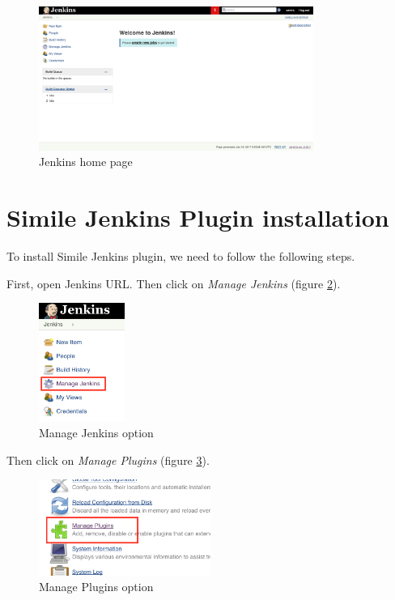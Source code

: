 \begin{figure}[H]
	\centering
    \includegraphics[width=0.8\textwidth]{grafiken/jenkins-04}
    \caption{Jenkins home page}
    \label{fig:jenkins-04}
\end{figure}

\section{Simile Jenkins Plugin installation}
To install Simile Jenkins plugin, we need to follow the following steps.

First, open Jenkins URL. Then click on \textit{Manage Jenkins} (figure \ref{fig:jenkins-plugin-01}).

\begin{figure}[H]
	\centering
    \includegraphics[width=0.25\textwidth]{grafiken/jenkins-plugin-01}
    \caption{Manage Jenkins option}
    \label{fig:jenkins-plugin-01}
\end{figure}

Then click on \textit{Manage Plugins} (figure \ref{fig:jenkins-plugin-02}).

\begin{figure}[H]
	\centering
    \includegraphics[width=0.5\textwidth]{grafiken/jenkins-plugin-02}
    \caption{Manage Plugins option}
    \label{fig:jenkins-plugin-02}
\end{figure}

